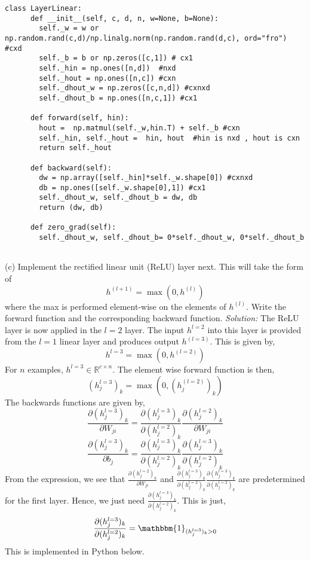 \documentclass[12pt]{article}
\begin{document}
\begin{lstlisting}
class LayerLinear:
      def __init__(self, c, d, n, w=None, b=None):
        self._w = w or np.random.rand(c,d)/np.linalg.norm(np.random.rand(d,c), ord="fro") #cxd
        self._b = b or np.zeros([c,1]) # cx1 
        self._hin = np.ones([n,d])  #nxd 
        self._hout = np.ones([n,c]) #cxn    
        self._dhout_w = np.zeros([c,n,d]) #cxnxd  
        self._dhout_b = np.ones([n,c,1]) #cx1 
     
      def forward(self, hin):
        hout =  np.matmul(self._w,hin.T) + self._b #cxn 
        self._hin, self._hout =  hin, hout  #hin is nxd , hout is cxn
        return self._hout
    
      def backward(self):
        dw = np.array([self._hin]*self._w.shape[0]) #cxnxd 
        db = np.ones([self._w.shape[0],1]) #cx1 
        self._dhout_w, self._dhout_b = dw, db 
        return (dw, db)
    
      def zero_grad(self):
        self._dhout_w, self._dhout_b= 0*self._dhout_w, 0*self._dhout_b
   
\end{lstlisting} 

(c) Implement the rectified linear unit (ReLU) layer next. This will take the form of
$$ h^{(l+1)}  = \max (0, h^{(l)} )   $$
where the max is performed element-wise on the elements of $h^{(l)}$.  Write the forward function and the corresponding backward function. \newline   \newline  
\emph{Solution:}  \newline 
The ReLU layer is now applied in the $l=2$ layer. The input $h^{l=2}$  into this layer is provided from the $l=1$ linear layer and produces output $ h^{(l=3)}$. This is given by, 
$$h^{l=3} = \max (0, h^{(l=2)} ) $$
For $n$ examples, $h^{l=3} \in \mathbb{R}^{c  \times n}$. The element wise forward function is then, 
$$ (h^{l=3}_{j})_{k} =  \max (0,( h_{j}^{(l=2)} )_{k} )  $$  
The backwards functions are given by, 
$$ \frac{\partial (h^{l=3}_{j})_{k}  }{ \partial W_{ji} }  = \frac{\partial (h^{l=3}_{j})_{k}  }{ \partial (h^{l=2}_{j})_{k}}  \frac{\partial  (h_{j}^{l=2} )_{k} }{\partial   W_{ji} }     $$
$$ \frac{\partial (h^{l=3}_{j})_{k}  }{\partial b_{j} }  =   \frac{\partial (h^{l=3}_{j})_{k}  }{ \partial (h^{l=2}_{j})_{k}}  \frac{\partial (h^{l=3}_{j})_{k}  }{ \partial (h^{l=2}_{j})_{k}} $$
From the expression, we see that  $ \frac{\partial  (h_{j}^{l=2} )_{k} }{\partial   W_{ji} } $ and $  \frac{\partial (h^{l=3}_{j})_{k}  }{ \partial (h^{l=2}_{j})_{k}}  \frac{\partial (h^{l=3}_{j})_{k}  }{ \partial (h^{l=2}_{j})_{k}} $ are predetermined for the first layer. Hence, we just need $\frac{\partial (h^{l=3}_{j})_{k}  }{ \partial (h^{l=2}_{j})_{k}}$. This is just, 
$$ \frac{\partial (h^{l=3}_{j})_{k}  }{ \partial (h^{l=2}_{j})_{k}}   =  \mathbbm{1}_{ (h^{l=3}_{j})_{k}   > 0 }   $$
This is implemented in Python below. 
\end{document}

